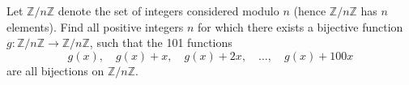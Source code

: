 Let $\mathbb{Z}/n\mathbb{Z}$ denote the set of integers considered modulo $n$ (hence $\mathbb{Z}/n\mathbb{Z}$ has $n$ elements). Find all positive integers $n$ for which there exists a bijective function $g: \mathbb{Z}/n\mathbb{Z} \to \mathbb{Z}/n\mathbb{Z}$, such that the 101 functions \[g(x), \quad g(x) + x, \quad g(x) + 2x, \quad \dots, \quad g(x) + 100x\] are all bijections on $\mathbb{Z}/n\mathbb{Z}$.